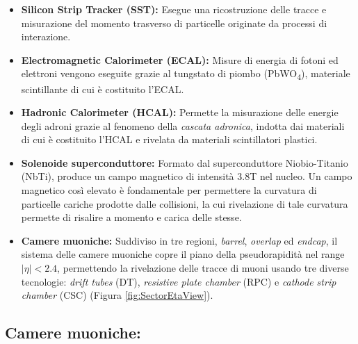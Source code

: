 \begin{itemize}
  \item \textbf{Silicon Strip Tracker (SST):} Esegue una ricostruzione delle tracce e misurazione del momento trasverso di particelle originate da processi di interazione. 
  \item \textbf{Electromagnetic Calorimeter (ECAL):} Misure di energia di fotoni ed elettroni vengono eseguite grazie al tungstato di piombo (\si{PbWO_4}), materiale scintillante di cui è costituito l'ECAL.
  \item \textbf{Hadronic Calorimeter (HCAL):} Permette la misurazione delle energie degli adroni grazie al fenomeno della \textit{cascata adronica}, indotta dai materiali di cui è costituito l'HCAL e rivelata da materiali scintillatori plastici.
  \item \textbf{Solenoide superconduttore:} Formato dal superconduttore Niobio-Titanio (NbTi), produce un campo magnetico di intensità 3.8T nel nucleo. Un campo magnetico così elevato è fondamentale per permettere la curvatura di particelle cariche prodotte dalle collisioni, la cui rivelazione di tale curvatura permette di risalire a momento e carica delle stesse.
  \item \textbf{Camere muoniche:} Suddiviso in tre regioni, \textit{barrel}, \textit{overlap} ed \textit{endcap}, il sistema delle camere muoniche copre il piano della pseudorapidità nel range $|\eta| < 2.4$, permettendo la rivelazione delle tracce di muoni usando tre diverse tecnologie: \textit{drift tubes} (DT), \textit{resistive plate chamber} (RPC) e \textit{cathode strip chamber} (CSC) \cite{TheMuonProject} (Figura \ref{fig:SectorEtaView}).
\end{itemize}


\subsection{Camere muoniche:}

